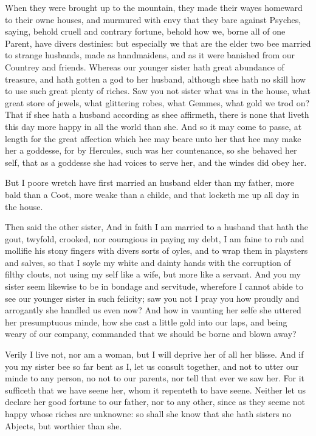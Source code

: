 When they were brought up to the mountain, they made their wayes homeward to
their owne houses, and murmured with envy that they bare against Psyches,
saying, behold cruell and contrary fortune, behold how we, borne all of one
Parent, have divers destinies: but especially we that are the elder two bee
married to strange husbands, made as handmaidens, and as it were banished from
our Countrey and friends. Whereas our younger sister hath great abundance of
treasure, and hath gotten a god to her husband, although shee hath no skill how
to use such great plenty of riches. Saw you not sister what was in the house,
what great store of jewels, what glittering robes, what Gemmes, what gold we
trod on? That if shee hath a husband according as shee affirmeth, there is none
that liveth this day more happy in all the world than she. And so it may come
to passe, at length for the great affection which hee may beare unto her that
hee may make her a goddesse, for by Hercules, such was her countenance, so she
behaved her self, that as a goddesse she had voices to serve her, and the
windes did obey her.

But I poore wretch have first married an husband elder than my father, more
bald than a Coot, more weake than a childe, and that locketh me up all day in
the house.

Then said the other sister, And in faith I am married to a husband that hath
the gout, twyfold, crooked, nor couragious in paying my debt, I am faine to rub
and mollifie his stony fingers with divers sorts of oyles, and to wrap them in
playsters and salves, so that I soyle my white and dainty hands with the
corruption of filthy clouts, not using my self like a wife, but more like a
servant. And you my sister seem likewise to be in bondage and servitude,
wherefore I cannot abide to see our younger sister in such felicity; saw you
not I pray you how proudly and arrogantly she handled us even now? And how in
vaunting her selfe she uttered her presumptuous minde, how she cast a little
gold into our laps, and being weary of our company, commanded that we should be
borne and blown away?

Verily I live not, nor am a woman, but I will deprive her of all her blisse.
And if you my sister bee so far bent as I, let us consult together, and not to
utter our minde to any person, no not to our parents, nor tell that ever we saw
her. For it sufficeth that we have seene her, whom it repenteth to have seene.
Neither let us declare her good fortune to our father, nor to any other, since
as they seeme not happy whose riches are unknowne: so shall she know that she
hath sisters no Abjects, but worthier than she.

